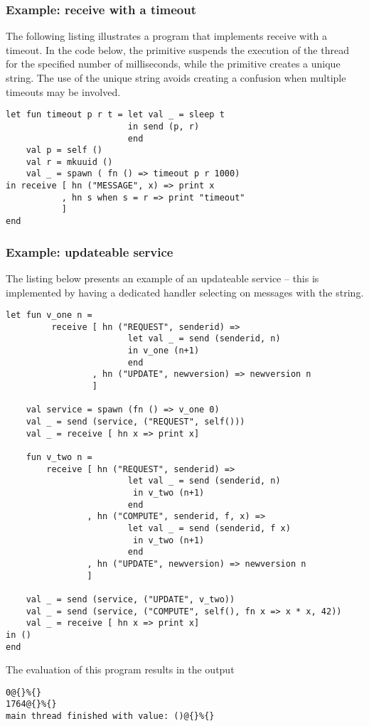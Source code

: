 \subsubsection{Example: receive with a timeout}
The following listing illustrates a program that implements
receive with a timeout. In the code below, the primitive 
suspends the execution of the thread for the specified number of milliseconds,
while the primitive  creates a unique string.
The use of the unique string avoids creating a confusion when multiple
timeouts may be involved.
\begin{lstlisting}
let fun timeout p r t = let val _ = sleep t
                        in send (p, r)
                        end
    val p = self () 
    val r = mkuuid () 
    val _ = spawn ( fn () => timeout p r 1000)    
in receive [ hn ("MESSAGE", x) => print x
           , hn s when s = r => print "timeout" 
           ]
end	
\end{lstlisting}

\subsubsection{Example: updateable service}
The listing below presents an example of an updateable service -- 
this is implemented by having a dedicated handler selecting on 
messages with the  string.

\begin{lstlisting}
let fun v_one n =
         receive [ hn ("REQUEST", senderid) => 
                        let val _ = send (senderid, n) 
                        in v_one (n+1) 
                        end
                 , hn ("UPDATE", newversion) => newversion n
                 ]
                 
    val service = spawn (fn () => v_one 0)
    val _ = send (service, ("REQUEST", self()))
    val _ = receive [ hn x => print x]
                    
    fun v_two n =
        receive [ hn ("REQUEST", senderid) => 
                        let val _ = send (senderid, n) 
                         in v_two (n+1) 
                        end
                , hn ("COMPUTE", senderid, f, x) =>
                        let val _ = send (senderid, f x)
                         in v_two (n+1)
                        end
                , hn ("UPDATE", newversion) => newversion n
                ]

    val _ = send (service, ("UPDATE", v_two))
    val _ = send (service, ("COMPUTE", self(), fn x => x * x, 42))
    val _ = receive [ hn x => print x]
in ()
end    
\end{lstlisting}
The evaluation of this program results in the output
\begin{verbatim}
0@{}%{}
1764@{}%{}
main thread finished with value: ()@{}%{}
\end{verbatim}



